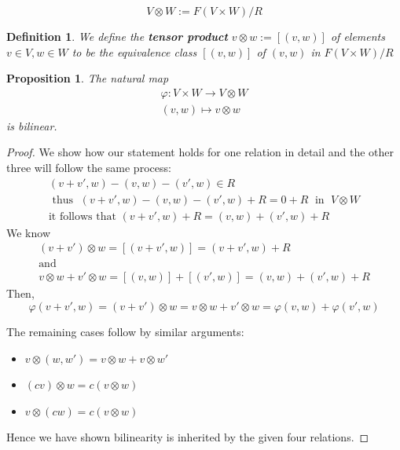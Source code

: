 \documentclass[12pt]{article}
\newtheorem{proposition}[theorem]{Proposition}
\newtheorem{definition}[theorem]{Definition}
\numberwithin{theorem}{section}
\numberwithin{equation}{theorem}
\begin{document}
$$ V \otimes W :=  F(V \times W)/R $$

\begin{definition}
    We define the \textbf{tensor product} $v \otimes w := [(v, w)]$ of elements $v \in V, w \in W$ to be the equivalence class $[(v, w)]$ of $(v, w)$ in $F(V \times W)/R$
\end{definition}

\begin{proposition}
    The natural map 
    \begin{gather*}
        \varphi: V \times W \longrightarrow V \otimes W \\
        (v, w) \mapsto v \otimes w
    \end{gather*}
    is bilinear.
\end{proposition}
\begin{proof}
    We show how our statement holds for one relation in detail and the other three will follow the same process:
    \begin{gather*}
        (v + v', w) - (v, w) - (v', w) \in R\\
        \text{ thus } \; (v + v', w) - (v, w) - (v', w) + R = 0 + R \; \text{ in } \; V \otimes W \\
        \text{it follows that } (v + v', w) + R =  (v, w) + (v', w) + R
    \end{gather*}
    We know 
    \begin{gather*}
        (v+v')\otimes w = [(v + v', w)] = (v + v', w) + R\\
        \text{and }\\ 
        v \otimes w + v' \otimes w = [(v, w)] + [(v', w)] = (v, w) + (v', w) + R
    \end{gather*}
    Then, 
    \begin{equation*}
        \varphi(v+v', w) = (v+v')\otimes w = v \otimes w + v' \otimes w = \varphi(v, w) + \varphi(v', w)
    \end{equation*}

    The remaining cases follow by similar arguments:
    \begin{itemize}
        \item $v \otimes (w, w') = v \otimes w + v \otimes w'$
        \item $ (cv) \otimes w = c(v \otimes w)$
        \item $ v \otimes (cw) = c(v \otimes w)$
    \end{itemize}

    Hence we have shown bilinearity is inherited by the given four relations.
\end{proof}
\end{document}

